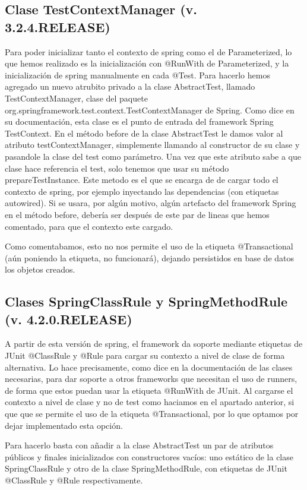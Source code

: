 \documentclass[a4paper]{article}
\begin{document}
\subsection{Clase TestContextManager (v. 3.2.4.RELEASE)}

Para poder inicializar tanto el contexto de spring como el de Parameterized, lo que hemos realizado es la inicialización con @RunWith de Parameterized, y la inicialización de spring manualmente en cada @Test. Para hacerlo hemos agregado un nuevo atrubito privado a la clase AbstractTest, llamado TestContextManager, clase del paquete org.springframework.test.context.TestContextManager de Spring. Como dice en su documentación, esta clase es el punto de entrada del framework Spring TestContext. En el método before de la clase AbstractTest le damos valor al atributo testContextManager, simplemente llamando al constructor de su clase y pasandole la clase del test como parámetro. Una vez que este atributo sabe a que clase hace referencia el test, solo tenemos que usar su método prepareTestInstance. Este metodo es el que se encarga de de cargar todo el contexto de spring, por ejemplo inyectando las dependencias (con etiquetas autowired). Si se usara, por algún motivo, algún artefacto del framework Spring en el método before, debería ser después de este par de lineas que hemos comentado, para que el contexto este cargado.

Como comentabamos, esto no nos permite el uso de la etiqueta @Transactional (aún poniendo la etiqueta, no funcionará), dejando persistidos en base de datos los objetos creados. 

\subsection{Clases SpringClassRule y SpringMethodRule \\ (v. 4.2.0.RELEASE)}

A partir de esta versión de spring, el framework da soporte mediante etiquetas de JUnit @ClassRule y @Rule para cargar su contexto a nivel de clase de forma alternativa. Lo hace precisamente, como dice en la documentación de las clases necesarias, para dar soporte a otros frameworks que necesitan el uso de runners, de forma que estos puedan usar la etiqueta @RunWith de JUnit. Al cargarse el contexto a nivel de clase y no de test como haciamos en el apartado anterior, si que que se permite el uso de la etiqueta @Transactional, por lo que optamos por dejar implementado esta opción.

Para hacerlo basta con añadir a la clase AbstractTest un par de atributos públicos y finales inicializados con constructores vacíos: uno estático de la clase SpringClassRule y otro de la clase SpringMethodRule, con etiquetas de JUnit @ClassRule y @Rule respectivamente.
\end{document}
